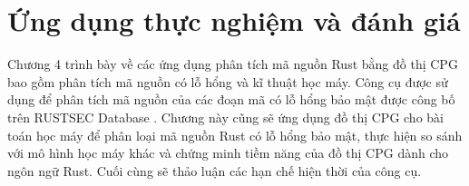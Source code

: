 \chapter{Ứng dụng thực nghiệm và đánh giá}
\label{chap:experiment}


Chương 4 trình bày về các ứng dụng phân tích mã nguồn Rust bằng đồ thị CPG bao gồm phân tích mã nguồn có lỗ hổng và kĩ thuật học máy.
Công cụ được sử dụng để phân tích mã nguồn của các đoạn mã có lỗ hổng bảo mật được công bố trên RUSTSEC Database \cite{rustsecAboutRustSec}.
Chương này cũng sẽ ứng dụng đồ thị CPG cho bài toán học máy để phân loại mã nguồn Rust có lỗ hổng bảo mật, thực hiện so sánh với mô hình học máy khác và chứng minh tiềm năng của đồ thị CPG dành cho ngôn ngữ Rust.
Cuối cùng sẽ thảo luận các hạn chế hiện thời của công cụ.




